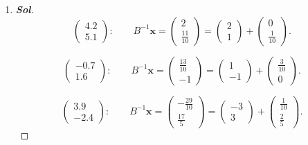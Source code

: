 \begin{enumerate}
	\item\begin{proof}[\normalfont\color{magenta}\bfseries Sol]
				\[
				\begin{pmatrix}
						4.2\\
						5.1
					\end{pmatrix}:
				\qquad
				B^{-1}\mathbf x
				=
				\begin{pmatrix}
						2\\[2pt]
						\frac{11}{10}
					\end{pmatrix}
				=
				\begin{pmatrix}
						2\\
						1
					\end{pmatrix}
				+
				\begin{pmatrix}
						0\\[2pt]
						\frac1{10}
					\end{pmatrix}.
				\]
				
				\[
				\begin{pmatrix}
						-0.7\\
						1.6
					\end{pmatrix}:
				\qquad
				B^{-1}\mathbf x
				=
				\begin{pmatrix}
						\frac{13}{10}\\[2pt]
						-1
					\end{pmatrix}
				=
				\begin{pmatrix}
						1\\
						-1
					\end{pmatrix}
				+
				\begin{pmatrix}
						\frac3{10}\\[2pt]
						0
					\end{pmatrix}.
				\]
				
				\[
				\begin{pmatrix}
						3.9\\
						-2.4
					\end{pmatrix}:
				\qquad
				B^{-1}\mathbf x
				=
				\begin{pmatrix}
						-\frac{29}{10}\\[2pt]
						\frac{17}{5}
					\end{pmatrix}
				=
				\begin{pmatrix}
						-3\\
						3
					\end{pmatrix}
				+
				\begin{pmatrix}
						\frac1{10}\\[2pt]
						\frac25
					\end{pmatrix}.
				\]
				

\end{proof}
\end{enumerate}
